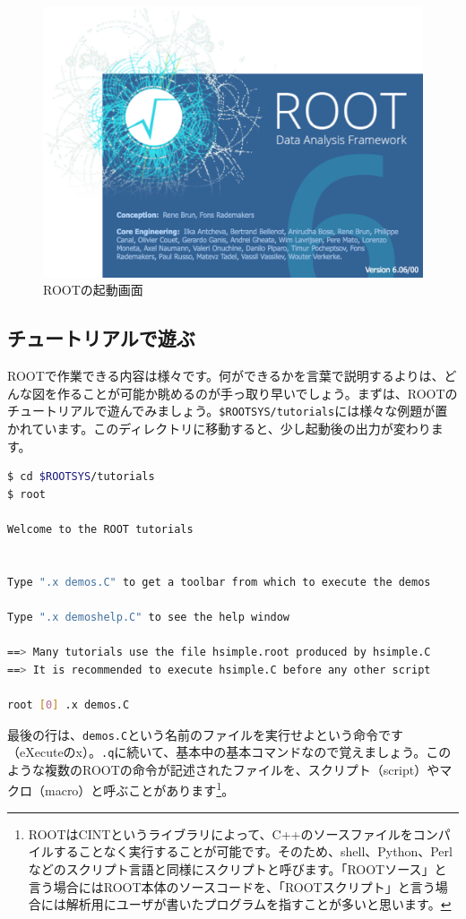 \begin{figure}
  \centering
  \includegraphics[width=12cm]{fig/splash6.png}
  \caption{ROOTの起動画面}
  \label{fig_splash}
\end{figure}

\subsection{チュートリアルで遊ぶ}
\label{subsec_tutorial}
ROOTで作業できる内容は様々です。何ができるかを言葉で説明するよりは、どんな図を作ることが可能か眺めるのが手っ取り早いでしょう。まずは、ROOTのチュートリアルで遊んでみましょう。\texttt{\$ROOTSYS/tutorials}には様々な例題が置かれています。このディレクトリに移動すると、少し起動後の出力が変わります。
\begin{lstlisting}[language=bash]
$ cd $ROOTSYS/tutorials
$ root

Welcome to the ROOT tutorials


Type ".x demos.C" to get a toolbar from which to execute the demos

Type ".x demoshelp.C" to see the help window

==> Many tutorials use the file hsimple.root produced by hsimple.C
==> It is recommended to execute hsimple.C before any other script

root [0] .x demos.C
\end{lstlisting}
最後の行は、\texttt{demos.C}という名前のファイルを実行せよという命令です（eXecuteのx）。\texttt{.q}に続いて、基本中の基本コマンドなので覚えましょう。このような複数のROOTの命令が記述されたファイルを、スクリプト（script）やマクロ（macro）と呼ぶことがあります\footnote{ROOTはCINTというライブラリによって、C++のソースファイルをコンパイルすることなく実行することが可能です。そのため、shell、Python、Perlなどのスクリプト言語と同様にスクリプトと呼びます。「ROOTソース」と言う場合にはROOT本体のソースコードを、「ROOTスクリプト」と言う場合には解析用にユーザが書いたプログラムを指すことが多いと思います。}。

